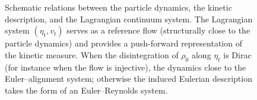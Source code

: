 \documentclass[10pt,reqno]{amsart}
\numberwithin{equation}{section}
\begin{document}
\begin{figure}[t]
\begin{center}
\end{center}

\caption{Schematic relations between the particle dynamics, the kinetic description, and the Lagrangian continuum system. The Lagrangian system $(\eta_t,v_t)$ serves as a reference flow (structurally close to the particle dynamics) and provides a push-forward representation of the kinetic measure. When the disintegration of $\rho_0$ along $\eta_t$ is Dirac (for instance when the flow is injective), the dynamics close to the Euler--alignment system; otherwise the induced Eulerian description takes the form of an Euler--Reynolds system.}
\end{figure}

 


                      


 
\end{document}
